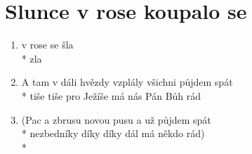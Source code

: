 \section{Slunce v rose koupalo se}
\begin{enumerate}
\item {} v rose  se  šla \\*
     zla   
\item A tam v dáli hvězdy vzplály všichni půjdem spát \\*
tiše tiše pro Ježíše má nás Pán Bůh rád 
\item (Pac a zbrusu novou pusu a už půjdem spát \\*
nezbedníky díky díky dál má někdo rád) \\*
\end{enumerate}
